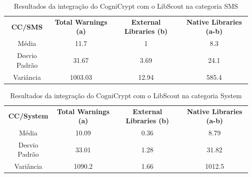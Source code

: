 \begin{table}[!htbp]
  \centering
  \small
  \begin{tabular}{|c|c|c|c|}
  
\textbf{CC/SMS}   & \textbf{Total Warnings (a)}   &  \textbf{External Libraries (b)} &  \textbf{Native Libraries (a-b)} \\ 
Média                      & \num{11.7}              & \num{1}                                        & \num{8.3}                                                    \\
Desvio Padrão              & \num{31.67}             & \num{3.69}                                        & \num{24.1}   \\                                                 
Variância                  & \num{1003.03}            & \num{12.94}                                       & \num{585.4}             \\                                       
\end{tabular}
    
  \caption{Resultados da integração do CogniCrypt com o LibScout na categoria SMS}
\label{table: AplicativosComWarningCCSMS}
\end{table}


\begin{table}[!htbp]
  \centering
  \small
  \begin{tabular}{|c|c|c|c|}
  
\textbf{CC/System}   & \textbf{Total Warnings (a)}   &  \textbf{External Libraries (b)} &  \textbf{Native Libraries (a-b)} \\ 
Média                      & \num{10.09}              & \num{0.36}                                        & \num{8.79}                                                    \\
Desvio Padrão              & \num{33.01}              & \num{1.28}                                        & \num{31.82}  \\                                                  
Variância                  & \num{1090.2}            & \num{1.66}                                       & \num{1012.5}  \\                                                  
\end{tabular}
    
  \caption{Resultados da integração do CogniCrypt com o LibScout na categoria System}
\label{table: AplicativosComWarningCCS}
\end{table}

